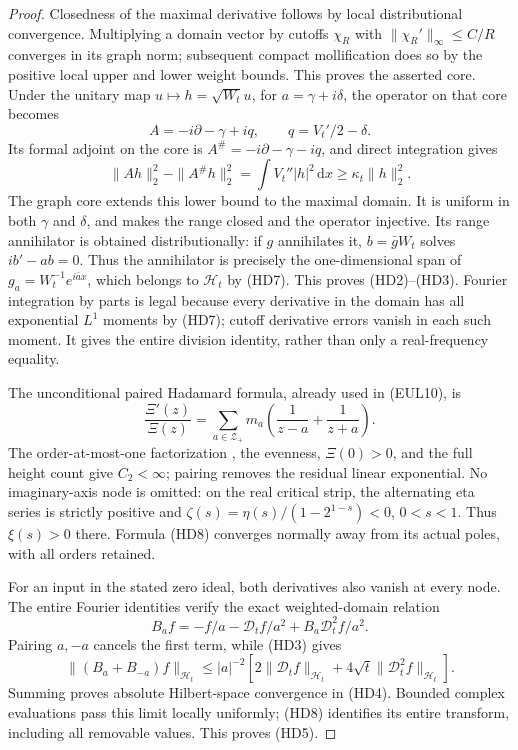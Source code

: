 \documentclass[11pt]{article}
\theoremstyle{remark}\newtheorem{remark}[theorem]{Remark}
\newcommand{\dd}{\,\mathrm d}
\begin{document}
\begin{proof}
Closedness of the maximal derivative follows by local
distributional convergence. Multiplying a domain vector by
cutoffs \(\chi_R\) with \(\|\chi_R'\|_\infty\le C/R\)
converges in its graph norm; subsequent compact mollification
does so by the positive local upper and lower weight bounds.
This proves the asserted core.
Under the unitary map \(u\mapsto h=\sqrt{W_t}u\), for
\(a=\gamma+i\delta\), the operator on that core becomes
\[
 A=-i\partial-\gamma+iq,\qquad q=V_t'/2-\delta .
\]
Its formal adjoint on the core is
\(A^\#=-i\partial-\gamma-iq\), and direct integration gives
\[
 \|Ah\|_2^2-\|A^\#h\|_2^2
       =\int V_t''|h|^2\dd x\ge\kappa_t\|h\|_2^2.
\]
The graph core extends this lower bound to the maximal domain.
It is uniform in both \(\gamma\) and \(\delta\), and makes
the range closed and the operator injective.
Its range annihilator is obtained distributionally: if \(g\)
annihilates it, \(b=\bar gW_t\) solves \(ib'-ab=0\).
Thus the annihilator is precisely the one-dimensional span of
\(g_a=W_t^{-1}e^{i\bar ax}\), which belongs to \(\mathcal H_t\)
by (HD7). This proves (HD2)--(HD3).
Fourier integration by parts is legal because every derivative
in the domain has all exponential \(L^1\) moments by (HD7);
cutoff derivative errors vanish in each such moment.
It gives the entire division identity, rather than only a
real-frequency equality.

The unconditional paired Hadamard formula, already used in
(EUL10), is
\[
 \frac{\Xi'(z)}{\Xi(z)}
  =\sum_{a\in\mathcal Z_+}m_a
                  \left(\frac1{z-a}+\frac1{z+a}\right).
                                                               \tag{HD8}
\]
The order-at-most-one factorization \cite[Theorem 7.7]{Petrow},
the evenness, \(\Xi(0)>0\), and the full height count give
\(C_2<\infty\); pairing removes the residual linear exponential.
No imaginary-axis node is omitted: on the real critical strip,
the alternating eta series is strictly positive and
\(\zeta(s)=\eta(s)/(1-2^{1-s})<0\), \(0<s<1\).
Thus \(\xi(s)>0\) there. Formula (HD8) converges normally away
from its actual poles, with all orders retained.

For an input in the stated zero ideal, both derivatives also
vanish at every node. The entire Fourier identities verify
the exact weighted-domain relation
\[
 B_af=-f/a-\mathcal D_tf/a^2+B_a\mathcal D_t^2f/a^2 .
\]
Pairing \(a,-a\) cancels the first term, while (HD3) gives
\[
 \|(B_a+B_{-a})f\|_{\mathcal H_t}
 \le |a|^{-2}
       [2\|\mathcal D_tf\|_{\mathcal H_t}
                  +4\sqrt t\|\mathcal D_t^2f\|_{\mathcal H_t}].
\]
Summing proves absolute Hilbert-space convergence in (HD4).
Bounded complex evaluations pass this limit locally uniformly;
(HD8) identifies its entire transform, including all removable
values. This proves (HD5).
\end{proof}
\end{document}
